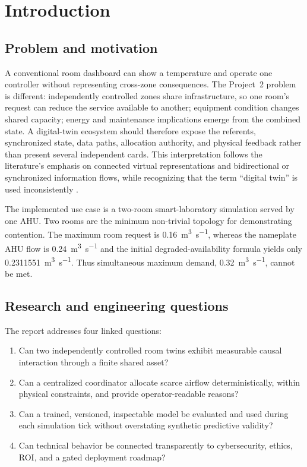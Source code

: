 \chapter{Introduction}
\label{ch:introduction}

\section{Problem and motivation}
A conventional room dashboard can show a temperature and operate one controller without representing cross-zone consequences. The Project~2 problem is different: independently controlled zones share infrastructure, so one room's request can reduce the service available to another; equipment condition changes shared capacity; energy and maintenance implications emerge from the combined state. A digital-twin ecosystem should therefore expose the referents, synchronized state, data paths, allocation authority, and physical feedback rather than present several independent cards. This interpretation follows the literature's emphasis on connected virtual representations and bidirectional or synchronized information flows, while recognizing that the term ``digital twin'' is used inconsistently \citep{grieves2017digital,jones2020systematic}.

The implemented use case is a two-room smart-laboratory simulation served by one AHU. Two rooms are the minimum non-trivial topology for demonstrating contention. The maximum room request is \SI{0.16}{\meter\cubed\per\second}, whereas the nameplate AHU flow is \SI{0.24}{\meter\cubed\per\second} and the initial degraded-availability formula yields only \SI{0.2311551}{\meter\cubed\per\second}. Thus simultaneous maximum demand, \SI{0.32}{\meter\cubed\per\second}, cannot be met.

\section{Research and engineering questions}
The report addresses four linked questions:
\begin{enumerate}
  \item Can two independently controlled room twins exhibit measurable causal interaction through a finite shared asset?
  \item Can a centralized coordinator allocate scarce airflow deterministically, within physical constraints, and provide operator-readable reasons?
  \item Can a trained, versioned, inspectable model be evaluated and used during each simulation tick without overstating synthetic predictive validity?
  \item Can technical behavior be connected transparently to cybersecurity, ethics, ROI, and a gated deployment roadmap?
\end{enumerate}


